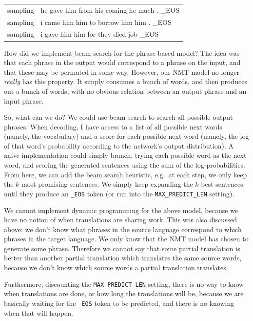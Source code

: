\documentclass[answers]{exam}
\begin{document}
\begin{CJK}{UTF8}{min}
\begin{questions}
\begin{framed}
\begin{compactenum}[1.]
  \begin{tabular}{ll}
    sampling & he gave him from his coming he much . \_EOS\\
    sampling & i came him him to borrow him him . \_EOS\\
    sampling & i gave him him for they died job \_EOS
  \end{tabular}
  \item
    How did we implement beam search for the phrase-based model? The idea was
    that each phrase in the output would correspond to a phrase on the input,
    and that these may be permuted in some way.
    However, our NMT model no longer \emph{really} has this property. It simply
    consumes a bunch of words, and then produces out a bunch of words, with no
    obvious relation between an output phrase and an input phrase.

    So, what can we do? We could use beam search to search all possible
    output phrases. When decoding, I have access to a list of all possible next
    words (namely, the vocabulary) and a score for each possible next word
    (namely, the log of that word's probability according to the network's
    output distribution). A naive implementation could simply branch, trying
    each possible word as the next word, and scoring the generated sentences
    using the sum of the log-probabilities.
    From here, we can add the beam search heuristic, e.g.\ at each step, we only
    keep the $k$ most promising sentences. We simply keep expanding the $k$ best
    sentences until they produce an \texttt{\_EOS} token (or run into the
    \texttt{MAX\_PREDICT\_LEN} setting).
  \item
    We cannot implement dynamic programming for the above model, because we have
    no notion of when translations are sharing work. This was also discussed
    above: we don't know what phrases in the source language correspond to which
    phrases in the target language. We only know that the NMT model has chosen
    to generate some phrase. Therefore we cannot say that some partial
    translation is better than another partial translation which translates the
    same source words, because we don't know which source words a partial
    translation translates.

    Furthermore, discounting the \texttt{MAX\_PREDICT\_LEN} setting, there is no
    way to know when translations are done, or how long the translations will
    be, because we are basically waiting for the \texttt{\_EOS} token to be
    predicted, and there is no knowing when that will happen.
\end{compactenum}
\end{framed}



\end{questions}
\end{CJK}
\end{document}
